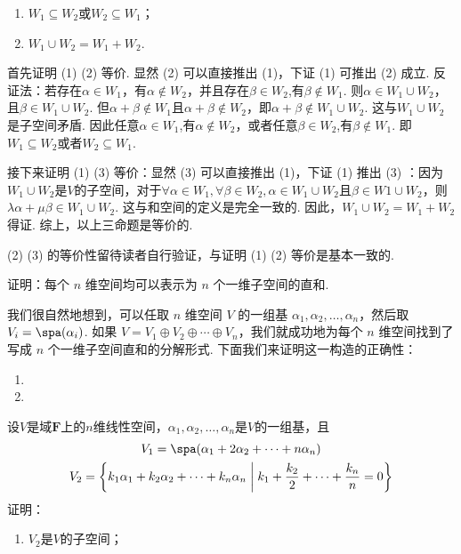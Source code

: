 \begin{exercise}
\begin{exgroup}
\begin{enumerate}
            \item $W_1 \subseteq W_2$或$W_2 \subseteq W_1$；

            \item $W_1 \cup W_2=W_1+W_2$.
        \end{enumerate}

        \begin{answer}
            首先证明 (1) (2) 等价. 显然 (2) 可以直接推出 (1)，下证 (1) 可推出 (2) 成立. 反证法：若存在$\alpha\in W_1$，有$\alpha\not\in W_2$，并且存在$\beta \in W_2$,有$\beta \not\in W_1$. 则$\alpha\in W_1\cup W_2$，且$\beta \in W_1\cup W_2$. 但$\alpha+\beta \not\in W_1$且$\alpha+\beta \not\in W_2$，即$\alpha+\beta \not\in W_1\cup W_2$. 这与$W_1\cup W_2$是子空间矛盾. 因此任意$\alpha\in W_1$,有$\alpha\not\in W_2$，或者任意$\beta \in W_2$,有$\beta\not\in W_1$. 即$W_1\subseteq W_2$或者$W_2\subseteq W_1$.

          接下来证明 (1) (3) 等价：显然 (3) 可以直接推出 (1)，下证 (1) 推出 (3) ：因为$W_1\cup W_2$是$V$的子空间，对于$\forall\alpha\in W_1,\forall	\beta \in W_2,\alpha\in W_1\cup W_2$且$\beta \in W1\cup W_2$，则 $\lambda\alpha+\mu\beta\in W_1\cup W_2$. 这与和空间的定义是完全一致的. 因此，$W_1\cup W_2=W_1+W_2$ 得证. 综上，以上三命题是等价的.

          (2) (3) 的等价性留待读者自行验证，与证明 (1) (2) 等价是基本一致的.
        \end{answer}

        \item 证明：每个 $n$ 维空间均可以表示为 $n$ 个一维子空间的直和.
        \begin{answer}
            我们很自然地想到，可以任取 $n$ 维空间 $V$ 的一组基 $\alpha_1,\alpha_2,\ldots,\alpha_n$，然后取 $V_i = \spa(\alpha_i)$. 如果 $V = V_1 \oplus V_2 \oplus \cdots \oplus V_n$，我们就成功地为每个 $n$ 维空间找到了写成 $n$ 个一维子空间直和的分解形式. 下面我们来证明这一构造的正确性：
            \begin{enumerate}
                \item
                \item
            \end{enumerate}
        \end{answer}

        \item 设$V$是域$\mathbf{F}$上的$n$维线性空间，$\alpha_1,\alpha_2,\ldots,\alpha_n$是$V$的一组基，且
        \begin{gather*}
            V_1=\spa(\alpha_1+2\alpha_2+\cdots+n\alpha_n) \\
            V_2=\left\{k_1\alpha_1+k_2\alpha_2+\cdots+k_n\alpha_n \;\middle|\; k_1+\dfrac{k_2}{2}+\cdots+\dfrac{k_n}{n}=0\right\}
        \end{gather*}
        证明：
        \begin{enumerate}
            \item $V_2$是$V$的子空间；


\end{enumerate}
\end{exgroup}
\end{exercise}
